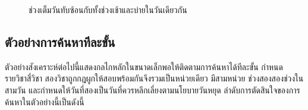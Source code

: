 \documentclass[12pt,a4paper]{article}
\begin{document}
\begin{figure}[tbp]\centering
{}
\caption{ช่วงเต็มวันทับซ้อนกับทั้งช่วงเช้าและบ่ายในวันเดียวกัน}
\label{fig:overlap}
\end{figure}
\subsection{ตัวอย่างการค้นหาทีละขั้น}
ตัวอย่างสังเคราะห์ต่อไปนี้แสดงกลไกหลักในขนาดเล็กพอให้ติดตามการค้นหาได้ทีละขั้น กำหนดรายวิชาสี่วิชา สองวิชาถูกกฎผูกให้สอบพร้อมกันจึงรวมเป็นหน่วยเดียว มีสามหน่วย ช่วงสองสองช่วงในสามวัน และกำหนดให้วันที่สองเป็นวันที่ควรหลีกเลี่ยงตามนโยบายวันหยุด ลำดับการตัดสินใจของการค้นหาในตัวอย่างนี้เป็นดังนี้
\end{document}

